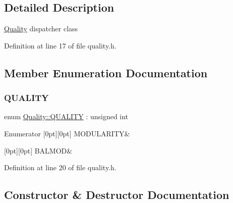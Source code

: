 \subsection{Detailed Description}
\hyperlink{classQuality}{Quality} dispatcher class 

Definition at line 17 of file quality.\+h.



\subsection{Member Enumeration Documentation}
\mbox{\label{classQuality_ada8fae04627fbcaa8d41a1d42ae124df}} 
\subsubsection{\texorpdfstring{Q\+U\+A\+L\+I\+TY}{QUALITY}}
{\footnotesize\ttfamily enum \hyperlink{classQuality_ada8fae04627fbcaa8d41a1d42ae124df}{Quality\+::\+Q\+U\+A\+L\+I\+TY} \+: unsigned int\hspace{0.3cm}{\ttfamily [strong]}}

\begin{DoxyEnumFields}{Enumerator}
[0pt][0pt]{}\mbox{\label{classQuality_ada8fae04627fbcaa8d41a1d42ae124dfa2a7d416fbe43baf234420601ea73d946}} 
M\+O\+D\+U\+L\+A\+R\+I\+TY&\\
\hline

[0pt][0pt]{}\mbox{\label{classQuality_ada8fae04627fbcaa8d41a1d42ae124dfa2ca6c7acaa036f0d3b18d83b688b2df9}} 
B\+A\+L\+M\+OD&\\
\hline

\end{DoxyEnumFields}


Definition at line 20 of file quality.\+h.



\subsection{Constructor \& Destructor Documentation}
\mbox{\label{classQuality_aaf6c17096575e026401ccdc252b69c90}} 

